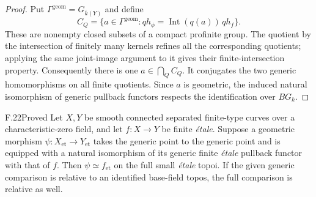 \begin{proof}
Put $\Gamma^{\mathrm{geom}}=G_{\bar k(Y)}$ and define
\[
 C_Q=\{a\in\Gamma^{\mathrm{geom}}:
        q h_\phi=\operatorname{Int}(q(a))\,q h_f\}.
\]
These are nonempty closed subsets of a compact profinite group.
The quotient by the intersection of finitely many kernels refines
all the corresponding quotients; applying the same joint-image
argument to it gives their finite-intersection property.
Consequently there is one $a\in\bigcap_Q C_Q$. It conjugates
the two generic homomorphisms on all finite quotients. Since $a$
is geometric, the induced natural isomorphism of generic
pullback functors respects the identification over $BG_k$.
\end{proof}

\begin{claim}{F.22}{Proved}
Let $X,Y$ be smooth connected separated finite-type curves over a
characteristic-zero field, and let $f:X\to Y$ be finite
\emph{\'etale}. Suppose a geometric morphism
$\psi:X_{\mathrm{et}}\to Y_{\mathrm{et}}$ takes the generic
point to the generic point and is equipped with a natural
isomorphism of its generic finite \emph{\'etale} pullback functor
with that of $f$. Then $\psi\simeq f_{\mathrm{et}}$ on the full
small \emph{\'etale} topoi. If the given generic comparison is
relative to an identified base-field topos, the full comparison
is relative as well.
\end{claim}
